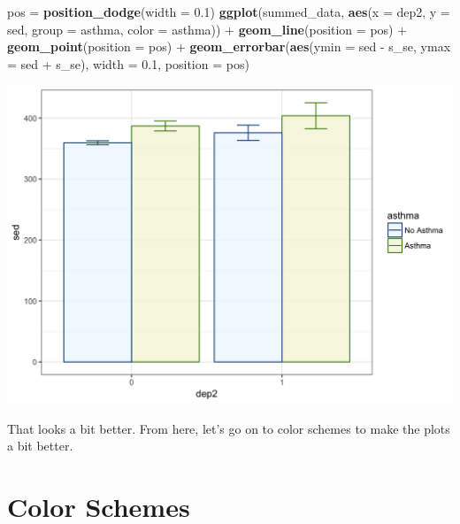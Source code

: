 \documentclass[]{tufte-book}
\newenvironment{Shaded}{}{}
\newcommand{\KeywordTok}[1]{\textcolor[rgb]{0.00,0.44,0.13}{\textbf{#1}}}
\newcommand{\DataTypeTok}[1]{\textcolor[rgb]{0.56,0.13,0.00}{#1}}
\newcommand{\FloatTok}[1]{\textcolor[rgb]{0.25,0.63,0.44}{#1}}
\newcommand{\StringTok}[1]{\textcolor[rgb]{0.25,0.44,0.63}{#1}}
\newcommand{\OperatorTok}[1]{\textcolor[rgb]{0.40,0.40,0.40}{#1}}
\newcommand{\NormalTok}[1]{#1}
\theoremstyle{definition}
\theoremstyle{definition}
\theoremstyle{remark}
\begin{document}
\begin{Shaded}
\begin{Highlighting}[]
\NormalTok{pos =}\StringTok{ }\KeywordTok{position_dodge}\NormalTok{(}\DataTypeTok{width =} \FloatTok{0.1}\NormalTok{)}
\KeywordTok{ggplot}\NormalTok{(summed_data, }\KeywordTok{aes}\NormalTok{(}\DataTypeTok{x =}\NormalTok{ dep2, }\DataTypeTok{y =}\NormalTok{ sed, }\DataTypeTok{group =}\NormalTok{ asthma, }
    \DataTypeTok{color =}\NormalTok{ asthma)) }\OperatorTok{+}\StringTok{ }\KeywordTok{geom_line}\NormalTok{(}\DataTypeTok{position =}\NormalTok{ pos) }\OperatorTok{+}\StringTok{ }
\StringTok{    }\KeywordTok{geom_point}\NormalTok{(}\DataTypeTok{position =}\NormalTok{ pos) }\OperatorTok{+}\StringTok{ }\KeywordTok{geom_errorbar}\NormalTok{(}\KeywordTok{aes}\NormalTok{(}\DataTypeTok{ymin =}\NormalTok{ sed }\OperatorTok{-}\StringTok{ }
\StringTok{    }\NormalTok{s_se, }\DataTypeTok{ymax =}\NormalTok{ sed }\OperatorTok{+}\StringTok{ }\NormalTok{s_se), }\DataTypeTok{width =} \FloatTok{0.1}\NormalTok{, }\DataTypeTok{position =}\NormalTok{ pos)}
\end{Highlighting}
\end{Shaded}

\includegraphics{_main_files/figure-latex/unnamed-chunk-146-1}

That looks a bit better. From here, let's go on to color schemes to make
the plots a bit better.

\section*{Color Schemes}\label{color-schemes}
\end{document}
